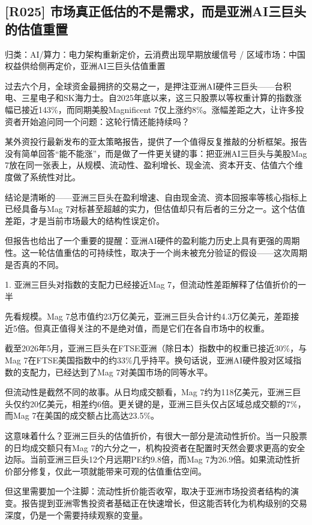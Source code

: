 \documentclass[11pt]{ctexart}
\begin{document}
\subsection{[R025] 市场真正低估的不是需求，而是亚洲AI三巨头的估值重置}
{\small\color{refgray}归类：AI/算力：电力架构重新定价，云消费出现早期放缓信号 / 区域市场：中国权益供给侧再定价，亚洲AI三巨头估值重置}

过去六个月，全球资金最拥挤的交易之一，是押注亚洲AI硬件三巨头——台积电、三星电子和SK海力士。自2025年底以来，这三只股票以等权重计算的指数涨幅已接近143\%，而同期美股Magnificent 7仅上涨约8\%。涨幅差距之大，让许多投资者开始追问同一个问题：这轮行情还能持续吗？

某外资投行最新发布的亚太策略报告，提供了一个值得反复推敲的分析框架。报告没有简单回答“能不能涨”，而是做了一件更关键的事：把亚洲AI三巨头与美股Mag 7放在同一张表上，从规模、流动性、盈利增长、现金流、资本开支、估值六个维度做了系统性对比。

结论是清晰的——亚洲三巨头在盈利增速、自由现金流、资本回报率等核心指标上已经具备与Mag 7对标甚至超越的实力，但估值却只有后者的三分之一。这个估值差距，才是当前市场最大的结构性误定价。

但报告也给出了一个重要的提醒：亚洲AI硬件的盈利能力历史上具有更强的周期性。这一轮估值重估的可持续性，取决于一个尚未被充分验证的假设——这次周期是否真的不同。

1. 亚洲三巨头对指数的支配力已经接近Mag 7，但流动性差距解释了估值折价的一半

先看规模。Mag 7总市值约23万亿美元，亚洲三巨头合计约4.3万亿美元，差距接近5倍。但真正值得关注的不是绝对值，而是它们在各自市场中的权重。

截至2026年5月，亚洲三巨头在FTSE亚洲（除日本）指数中的权重已接近30\%，与Mag 7在FTSE美国指数中的约33\%几乎持平。换句话说，亚洲AI硬件股对区域指数的支配力，已经达到了Mag 7对美国市场的同等水平。

但流动性是截然不同的故事。从日均成交额看，Mag 7约为118亿美元，亚洲三巨头仅约20亿美元，相差约6倍。更关键的是，亚洲三巨头仅占区域总成交额的7\%，而Mag 7在美国的成交额占比高达23.5\%。

这意味着什么？亚洲三巨头的估值折价，有很大一部分是流动性折价。当一只股票的日均成交额只有Mag 7的六分之一，机构投资者在配置时天然会要求更高的安全边际。当前亚洲三巨头12个月远期PE约9.8倍，而Mag 7为26.9倍。如果流动性折价部分修复，仅此一项就能带来可观的估值重估空间。

但这里需要加一个注脚：流动性折价能否收窄，取决于亚洲市场投资者结构的演变。报告提到亚洲零售投资者基础正在快速增长，但这能否转化为机构级别的交易深度，仍是一个需要持续观察的变量。
\end{document}
